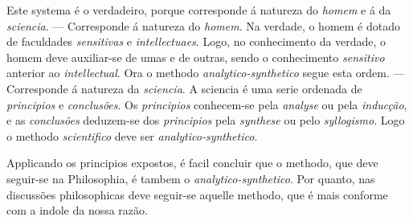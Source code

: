 Este systema é o verdadeiro, porque corresponde á natureza do \emph{homem} e á da \emph{sciencia}. --- Corresponde á natureza do \emph{homem}. Na verdade, o homem é dotado de faculdades \emph{sensitivas} e \emph{intellectuaes}. Logo, no conhecimento da verdade, o homem deve auxiliar-se de umas e de outras, sendo o conhecimento \emph{sensitivo} anterior ao \emph{intellectual}. Ora o methodo \emph{analytico-synthetico} segue esta ordem. --- Corresponde á natureza da \emph{sciencia}. A sciencia é uma serie ordenada de \emph{principios} e \emph{conclusões}. Os \emph{principios} conhecem-se pela \emph{analyse} ou pela \emph{inducção}, e as \emph{conclusões} deduzem-se dos \emph{principios} pela \emph{synthese} ou pelo \emph{syllogismo}. Logo o methodo \emph{scientifico} deve ser \emph{analytico-synthetico}.


Applicando os principios expostos, é facil concluir que o methodo, que deve seguir-se na Philosophia, é tambem o \emph{analytico-synthetico}. Por quanto, nas discussões philosophicas deve seguir-se aquelle    methodo, que é mais conforme com a indole da nossa razão.

